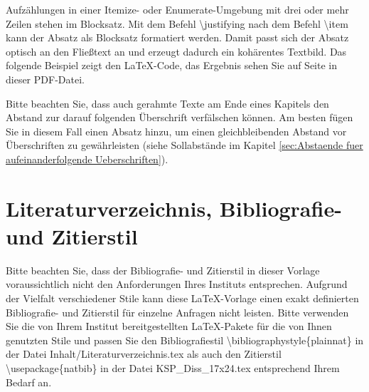 
Aufzählungen in einer Itemize- oder Enumerate-Umgebung mit drei oder mehr Zeilen stehen im Blocksatz. Mit dem Befehl \glqq \textbackslash justifying\grqq{} nach dem Befehl \glqq \textbackslash item\grqq{} kann der Absatz als Blocksatz formatiert werden. Damit passt sich der Absatz optisch an den Fließtext an und erzeugt dadurch ein kohärentes Textbild. Das folgende Beispiel zeigt den \LaTeX-Code, das Ergebnis sehen Sie auf Seite \pageref{itm:BeispielItemize} in dieser PDF-Datei.


Bitte beachten Sie, dass auch gerahmte Texte am Ende eines Kapitels den Abstand zur darauf folgenden Überschrift verfälschen können. Am besten fügen Sie in diesem Fall einen Absatz hinzu, um einen gleichbleibenden Abstand vor Überschriften zu gewährleisten (siehe Sollabstände im Kapitel \ref{sec:Abstaende fuer aufeinanderfolgende Ueberschriften}).





\section{Literaturverzeichnis, Bibliografie- und Zitierstil}
Bitte beachten Sie, dass der Bibliografie- und Zitierstil in dieser Vorlage voraussichtlich nicht den Anforderungen Ihres Instituts entsprechen. Aufgrund der Vielfalt verschiedener Stile kann diese \LaTeX-Vorlage einen exakt definierten Bibliografie- und Zitierstil für einzelne Anfragen nicht leisten. Bitte verwenden Sie die von Ihrem Institut bereitgestellten \LaTeX-Pakete für die von Ihnen genutzten Stile und passen Sie den Bibliografiestil \glqq \textbackslash bibliographystyle\{plainnat\}\grqq{} in der Datei \glqq Inhalt/Literaturverzeichnis.tex\grqq{} als auch den Zitierstil \glqq \textbackslash usepackage\{natbib\}\grqq{} in der Datei \glqq KSP\_Diss\_17x24.tex\grqq{} entsprechend Ihrem Bedarf an. 

